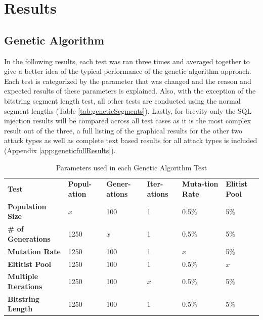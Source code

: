 \chapter{Results} 

\section{Genetic Algorithm}

In the following results, each test was ran three times and averaged together to give a better idea of the typical performance of the genetic algorithm approach.  Each test is categorized by the parameter that was changed and the reason and expected results of these parameters is explained.  Also, with the exception of the bitstring segment length test, all other tests are conducted using the normal segment lengths (Table \ref{tab:geneticSegments}).  Lastly, for brevity only the SQL injection results will be compared across all test cases as it is the most complex result out of the three, a full listing of the graphical results for the other two attack types as well as complete text based results for all attack types is included (Appendix \ref{app:geneticfullResults}).

\begin{table}
	\centering
	\label{tab:gaTestParameters}
	\begin{tabular}{|p{1.5in}|p{0.675in}|p{0.675in}|p{0.675in}|p{0.675in}|p{0.675in}|}
	\hline
	\textbf{Test} & \textbf{Popul-ation} & \textbf{Gener-ations} & \textbf{Iter-ations} & \textbf{Muta-tion Rate} & \textbf{Elitist Pool} \\ 
	\hhline{|=|=|=|=|=|=|}
	\textbf{Population Size} & \textbf{$x$} & 100 & 1 & 0.5\% & 5\% \\
	\hline
	\textbf{\# of Generations} & 1250 & \textbf{$x$} & 1 & 0.5\% & 5\% \\
	\hline
	\textbf{Mutation Rate} & 1250 & 100 & 1 & \textbf{$x$} & 5\% \\
	\hline
	\textbf{Eltitist Pool} & 1250 & 100 & 1 & 0.5\% & \textbf{$x$} \\
	\hline
	\textbf{Multiple Iterations} & 1250 & 100 & \textbf{$x$} & 0.5\% & 5\% \\
	\hline
	\textbf{Bitstring Length} & 1250 & 100 & 1 & 0.5\% & 5\% \\
	\hline
	\end{tabular}
	\caption{Parameters used in each Genetic Algorithm Test}
\end{table}

